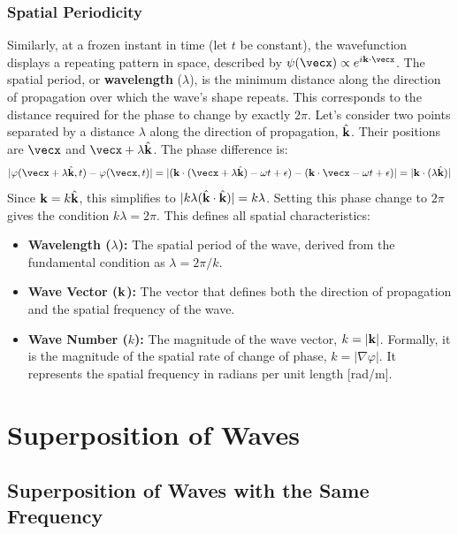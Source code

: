 \begin{proposition}
\subsubsection*{Spatial Periodicity}
Similarly, at a frozen instant in time (let $t$ be constant), the wavefunction displays a repeating pattern in space, described by $\psi(\vecx) \propto e^{i\vecbf{k} \cdot \vecx}$. The spatial period, or \textbf{wavelength} ($\lambda$), is the minimum distance along the direction of propagation over which the wave's shape repeats. This corresponds to the distance required for the phase to change by exactly $2\pi$.
Let's consider two points separated by a distance $\lambda$ along the direction of propagation, $\hat{\mathbf{k}}$. Their positions are $\vecx$ and $\vecx + \lambda\hat{\vecbf{k}}$. The phase difference is:
$$ |\varphi(\vecx + \lambda\hat{\vecbf{k}}, t) - \varphi(\vecx, t)| = |(\vecbf{k} \cdot (\vecx + \lambda\hat{\vecbf{k}}) - \omega t + \epsilon) - (\vecbf{k} \cdot \vecx - \omega t + \epsilon)| = |\vecbf{k} \cdot (\lambda\hat{\vecbf{k}})| $$
Since $\mathbf{k} = k\hat{\mathbf{k}}$, this simplifies to $|k\lambda(\hat{\mathbf{k}}\cdot\hat{\mathbf{k}})| = k\lambda$. Setting this phase change to $2\pi$ gives the condition $k\lambda = 2\pi$. This defines all spatial characteristics:
\begin{itemize}
    \item \textbf{Wavelength ($\lambda$):} The spatial period of the wave, derived from the fundamental condition as $\lambda = 2\pi/k$.
    \item \textbf{Wave Vector ($\mathbf{k}$):} The vector that defines both the direction of propagation and the spatial frequency of the wave.
     \item \textbf{Wave Number ($k$):} The magnitude of the wave vector, $k=|\mathbf{k}|$. Formally, it is the magnitude of the spatial rate of change of phase, $k = |\nabla\varphi|$. It represents the spatial frequency in radians per unit length [rad/m].
\end{itemize}
\end{proposition}

\section{Superposition of Waves}

\subsection{Superposition of Waves with the Same Frequency}

